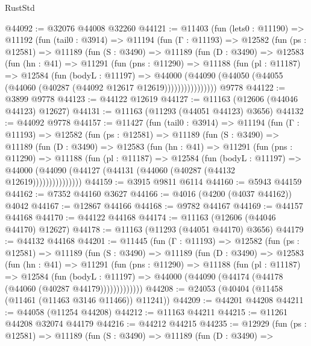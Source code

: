 \begin{lexlean}{RustStd}
\begin{coremodule}
@44092 := @32076 @44008 @32260
@44121 := @11403
    (fun (lets0 : @11190) =>
    @11192
      (fun (tail0 : @3914) =>
      @11194
        (fun (Γ : @11193) =>
        @12582
          (fun (ps : @12581) =>
          @11189
            (fun (S : @3490) =>
            @11189
              (fun (D : @3490) =>
              @12583
                (fun (hn : @41) =>
                @11291
                  (fun (pns : @11290) =>
                  @11188
                    (fun (pl : @11187) =>
                    @12584
                      (fun (bodyL : @11197) =>
                      @44000
                        (@44090
                          (@44050 (@44055 (@44060 (@40287 (@44092 @12617 @12619))))))))))))))))
    @9778
@44122 := @3899 @9778
@44123 := @44122 @12619
@44127 := @11163 (@12606 (@44046 @44123) @12627)
@44131 := @11163 (@11293 (@44051 @44123) @3656)
@44132 := @44092 @9778
@44157 := @11427
    (fun (tail0 : @3914) =>
    @11194
      (fun (Γ : @11193) =>
      @12582
        (fun (ps : @12581) =>
        @11189
          (fun (S : @3490) =>
          @11189
            (fun (D : @3490) =>
            @12583
              (fun (hn : @41) =>
              @11291
                (fun (pns : @11290) =>
                @11188
                  (fun (pl : @11187) =>
                  @12584
                    (fun (bodyL : @11197) =>
                    @44000 (@44090 (@44127 (@44131 (@44060 (@40287 (@44132 @12619)))))))))))))))
@44159 := @3915 @9811 @6114
@44160 := @5943 @44159
@44162 := @7352 @44160 @3627
@44166 := @4016 (@4200 (@4037 @44162)) @4042
@44167 := @12867 @44166
@44168 := @9782 @44167
@44169 := @44157 @44168
@44170 := @44122 @44168
@44174 := @11163 (@12606 (@44046 @44170) @12627)
@44178 := @11163 (@11293 (@44051 @44170) @3656)
@44179 := @44132 @44168
@44201 := @11445
    (fun (Γ : @11193) =>
    @12582
      (fun (ps : @12581) =>
      @11189
        (fun (S : @3490) =>
        @11189
          (fun (D : @3490) =>
          @12583
            (fun (hn : @41) =>
            @11291
              (fun (pns : @11290) =>
              @11188
                (fun (pl : @11187) =>
                @12584
                  (fun (bodyL : @11197) =>
                  @44000 (@44090 (@44174 (@44178 (@44060 (@40287 @44179)))))))))))))
@44208 := @24053 (@40404 (@11458 (@11461 (@11463 @3146 @11466)) @11241))
@44209 := @44201 @44208
@44211 := @44058 (@11254 @44208)
@44212 := @11163 @44211
@44215 := @11261 @44208 @32074 @44179
@44216 := @44212 @44215
@44235 := @12929
    (fun (ps : @12581) =>
    @11189
      (fun (S : @3490) =>
      @11189
        (fun (D : @3490) =>

\end{coremodule}
\end{lexlean}
